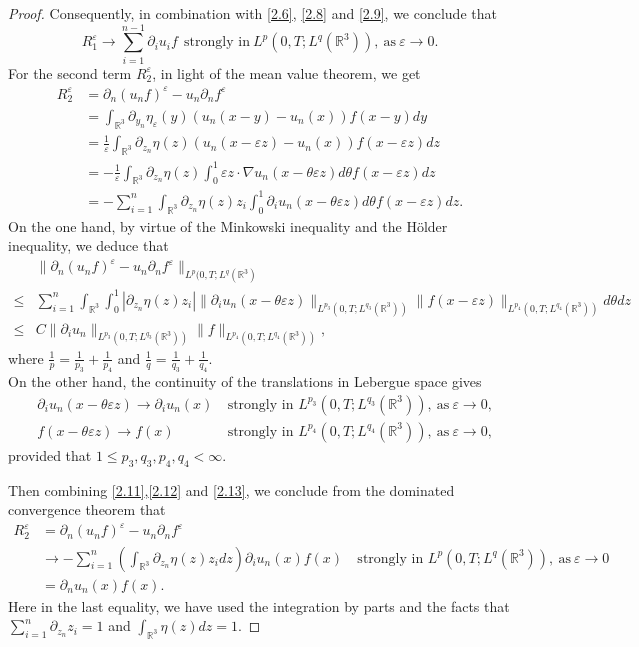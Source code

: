 \documentclass[11pt]{article}
\theoremstyle{plain}\newtheorem{definition}{Definition}[section]
\theoremstyle{definition}\newtheorem{theorem}{Theorem}[section]
\theoremstyle{plain}\newtheorem{lemma}[theorem]{Lemma}
\theoremstyle{plain}\newtheorem{coro}[theorem]{Corollary}
\theoremstyle{plain}\newtheorem{prop}[theorem]{Proposition}
\theoremstyle{remark}\newtheorem{remark}{Remark}[section]
\newcommand{\be}{\begin{equation}}
\newcommand{\ee}{\end{equation}}
\newcommand{\ba}{\begin{aligned}}
\newcommand{\ea}{\end{aligned}}
\newcommand{\f}{\frac}
\numberwithin{equation}{section}
\begin{document}
\begin{proof}
Consequently, in combination with \eqref{2.6}, \eqref{2.8} and \eqref{2.9}, we conclude that
\be\label{2.10}
R_1^\varepsilon \rightarrow \sum_{i=1}^{n-1} \partial_i u_i f~~\text{strongly~in}~L^p(0,T;L^q(\mathbb{R}^3)),~\text{as}~\varepsilon \to 0.
\ee
For the second term $R_2^\varepsilon$, in light of the mean value theorem, we get
\be\label{2.11}\ba
R_2^\varepsilon &=\partial_{n}(u_{n}f)^\varepsilon  -   u_{n}\partial_{n}  f^\varepsilon\\
&=\int_{\mathbb{R}^3}\partial_{y_n} \eta_\varepsilon (y)\left(u_n(x-y)-u_n(x)\right)f(x-y) dy\\
&=\f{1}{\varepsilon}\int_{\mathbb{R}^3}\partial_{z_n}\eta(z)\left(u_n(x-\varepsilon z)-u_n(x)\right) f(x-\varepsilon z) dz\\
&=-\f{1}{\varepsilon}\int_{\mathbb{R}^3}\partial_{z_n}\eta(z)\int_0^1 \varepsilon z \cdot \nabla u_{n}(x-\theta \varepsilon z) d\theta  f(x-\varepsilon z) dz\\
&=-\sum_{i=1}^n \int_{\mathbb{R}^3}\partial_{z_n}\eta(z) z_i\int_0^1 \partial_i u_{n}(x-\theta \varepsilon z) d\theta  f(x-\varepsilon z) dz.
\ea\ee
On the one hand, by virtue of the Minkowski inequality and the H\"older inequality, we deduce that
\be\label{2.12}\ba
&\|\partial_{n}(u_{n}f)^\varepsilon  -   u_{n}\partial_{n}  f^\varepsilon\|_{L^p(0,T;L^q(\mathbb{R}^3)}\\
\leq & \sum_{i=1}^n \int_{\mathbb{R}^3}\int_0^1 |\partial_{z_n}\eta (z) z_i |\|\partial_i u_n(x-\theta \varepsilon z)\|_{L^{p_3}(0,T;L^{q_3}(\mathbb{R}^3))}\|f(x-\varepsilon z)\|_{L^{p_4}(0,T;L^{q_4}(\mathbb{R}^3))} d\theta dz\\
\leq& C\|\partial_i u_n\|_{L^{p_3}(0,T;L^{q_3}(\mathbb{R}^3))}\|f\|_{L^{p_4}(0,T;L^{q_4}(\mathbb{R}^3))},
\ea\ee
where $\f{1}{p}=\f{1}{p_3}+\f{1}{p_4}$ and $\f{1}{q}=\f{1}{q_3}+\f{1}{q_4}$.\\
On the other hand, the  continuity of the translations in Lebergue space gives
\be\label{2.13}\ba
&\partial_i u_n(x-\theta \varepsilon z)\rightarrow \partial_i u_n(x)~&\text{strongly~in~} L^{p_3}(0,T;L^{q_3}(\mathbb{R}^3)), ~\text{as} ~\varepsilon \to 0,\\
&f(x-\theta \varepsilon z)\rightarrow f(x)~&\text{strongly~in~} L^{p_4}(0,T;L^{q_4}(\mathbb{R}^3)), ~\text{as} ~\varepsilon \to 0,
\ea\ee
provided that $1\leq p_3,q_3,p_4,q_4<\infty$.

Then combining \eqref{2.11},\eqref{2.12} and \eqref{2.13}, we conclude from the dominated convergence theorem that
\be\label{2.14}\ba
R_2^\varepsilon &=\partial_{n}(u_{n}f)^\varepsilon  -   u_{n}\partial_{n}  f^\varepsilon\\
&\to -\sum_{i=1}^n \left(\int_{\mathbb{R}^3} \partial_{z_n} \eta(z) z_i  dz\right) \partial_i u_n(x) f(x)~&\text{strongly~in~} L^{p}(0,T;L^{q}(\mathbb{R}^3)), ~\text{as} ~\varepsilon \to 0\\
&=\partial_n u_n(x) f(x).
\ea\ee
Here in the last equality, we have used the integration by parts and the facts that $\sum_{i=1}^n \partial_{z_n} z_i=1$ and $\int_{\mathbb{R}^3} \eta(z) dz=1$.


\end{proof}
\end{document}
